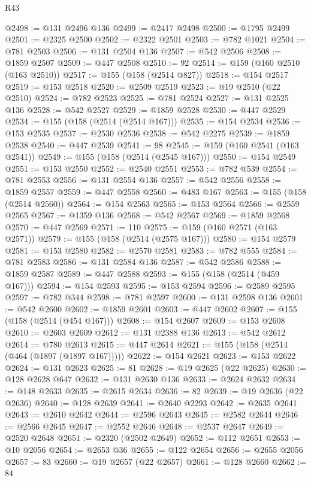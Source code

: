 \begin{lexlean}{R43}
\begin{coremodule}
@2498 := @131 @2496 @136
@2499 := @2417 @2498
@2500 := @1795 @2499
@2501 := @2325 @2500
@2502 := @2322 @2501
@2503 := @782 @1021
@2504 := @781 @2503
@2506 := @131 @2504 @136
@2507 := @542 @2506
@2508 := @1859 @2507
@2509 := @447 @2508
@2510 := 92
@2514 := @159 (@160 @2510 (@163 @2510))
@2517 := @155 (@158 (@2514 @827))
@2518 := @154 @2517
@2519 := @153 @2518
@2520 := @2509 @2519
@2523 := @19 @2510 (@22 @2510)
@2524 := @782 @2523
@2525 := @781 @2524
@2527 := @131 @2525 @136
@2528 := @542 @2527
@2529 := @1859 @2528
@2530 := @447 @2529
@2534 := @155 (@158 (@2514 (@2514 @167)))
@2535 := @154 @2534
@2536 := @153 @2535
@2537 := @2530 @2536
@2538 := @542 @2275
@2539 := @1859 @2538
@2540 := @447 @2539
@2541 := 98
@2545 := @159 (@160 @2541 (@163 @2541))
@2549 := @155 (@158 (@2514 (@2545 @167)))
@2550 := @154 @2549
@2551 := @153 @2550
@2552 := @2540 @2551
@2553 := @782 @539
@2554 := @781 @2553
@2556 := @131 @2554 @136
@2557 := @542 @2556
@2558 := @1859 @2557
@2559 := @447 @2558
@2560 := @483 @167
@2563 := @155 (@158 (@2514 @2560))
@2564 := @154 @2563
@2565 := @153 @2564
@2566 := @2559 @2565
@2567 := @1359 @136
@2568 := @542 @2567
@2569 := @1859 @2568
@2570 := @447 @2569
@2571 := 110
@2575 := @159 (@160 @2571 (@163 @2571))
@2579 := @155 (@158 (@2514 (@2575 @167)))
@2580 := @154 @2579
@2581 := @153 @2580
@2582 := @2570 @2581
@2583 := @782 @555
@2584 := @781 @2583
@2586 := @131 @2584 @136
@2587 := @542 @2586
@2588 := @1859 @2587
@2589 := @447 @2588
@2593 := @155 (@158 (@2514 (@459 @167)))
@2594 := @154 @2593
@2595 := @153 @2594
@2596 := @2589 @2595
@2597 := @782 @344
@2598 := @781 @2597
@2600 := @131 @2598 @136
@2601 := @542 @2600
@2602 := @1859 @2601
@2603 := @447 @2602
@2607 := @155 (@158 (@2514 (@454 @167)))
@2608 := @154 @2607
@2609 := @153 @2608
@2610 := @2603 @2609
@2612 := @131 @2388 @136
@2613 := @542 @2612
@2614 := @780 @2613
@2615 := @447 @2614
@2621 := @155 (@158 (@2514 (@464 (@1897 (@1897 @167)))))
@2622 := @154 @2621
@2623 := @153 @2622
@2624 := @131 @2623
@2625 := 81
@2628 := @19 @2625 (@22 @2625)
@2630 := @128 @2628 @647
@2632 := @131 @2630 @136
@2633 := @2624 @2632
@2634 := @148 @2633
@2635 := @2615 @2634
@2636 := 82
@2639 := @19 @2636 (@22 @2636)
@2640 := @128 @2639
@2641 := @2640 @2293
@2642 := @2635 @2641
@2643 := @2610 @2642
@2644 := @2596 @2643
@2645 := @2582 @2644
@2646 := @2566 @2645
@2647 := @2552 @2646
@2648 := @2537 @2647
@2649 := @2520 @2648
@2651 := @2320 (@2502 @2649)
@2652 := @112 @2651
@2653 := @10 @2056
@2654 := @2653 @36
@2655 := @122 @2654
@2656 := @2655 @2056
@2657 := 83
@2660 := @19 @2657 (@22 @2657)
@2661 := @128 @2660
@2662 := 84

\end{coremodule}
\end{lexlean}

